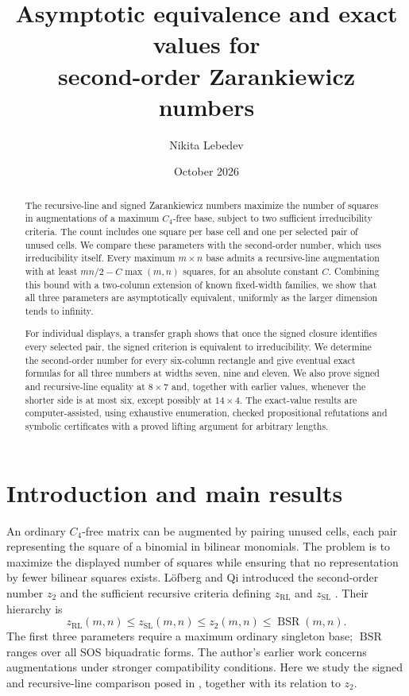\documentclass[11pt,a4paper]{article}
\title{Asymptotic equivalence and exact values for\\[2pt] second-order Zarankiewicz numbers}
\author{Nikita Lebedev}
\date{October 2026}
\theoremstyle{definition}
\newcommand{\zr}{z_{\mathrm{RL}}}
\newcommand{\zs}{z_{\mathrm{SL}}}
\newcommand{\zt}{z_2}
\newcommand{\BSR}{\operatorname{BSR}}
\begin{document}
\maketitle
\begin{abstract}
The recursive-line and signed Zarankiewicz numbers maximize the number
of squares in augmentations of a maximum $C_4$-free base, subject to two
sufficient irreducibility criteria. The count includes one square per
base cell and one per selected pair of unused cells. We compare these
parameters with the second-order number, which uses irreducibility itself.
Every maximum $m\times n$ base admits a recursive-line augmentation
with at least $mn/2-C\max(m,n)$ squares, for an absolute constant $C$.
Combining this bound with a two-column extension of known fixed-width
families, we show that all three parameters are asymptotically equivalent,
uniformly as the larger dimension tends to infinity.

For individual displays, a transfer graph shows that once the signed
closure identifies every selected pair, the signed criterion is
equivalent to irreducibility. We determine the second-order number for
every six-column rectangle and give eventual exact formulas for all
three numbers at widths seven, nine and eleven. We also prove signed and recursive-line
equality at $8\times7$ and, together with earlier values, whenever the
shorter side is at most six, except possibly at $14\times4$.
The exact-value results are computer-assisted, using exhaustive
enumeration, checked propositional refutations and symbolic certificates
with a proved lifting argument for arbitrary lengths.
\end{abstract}

\section{Introduction and main results}
An ordinary $C_4$-free matrix can be augmented by pairing unused cells,
each pair representing the square of a binomial in bilinear monomials.
The problem is to maximize the displayed number of squares while ensuring
that no representation by fewer bilinear squares exists. L\"ofberg and Qi
introduced the second-order number $\zt$ and the sufficient recursive
criteria defining $\zr$ and $\zs$ \cite{LQ}. Their hierarchy is
\begin{equation}\label{eq:hierarchy}
 \zr(m,n)\le\zs(m,n)\le\zt(m,n)\le\BSR(m,n).
\end{equation}
The first three parameters require a maximum ordinary singleton base;
$\BSR$ ranges over all SOS biquadratic forms. The author's earlier work
\cite{LebedevAugmented} concerns augmentations under stronger compatibility
conditions. Here we study the signed and recursive-line comparison posed
in \cite{CCQ}, together with its relation to $\zt$.
\end{document}
